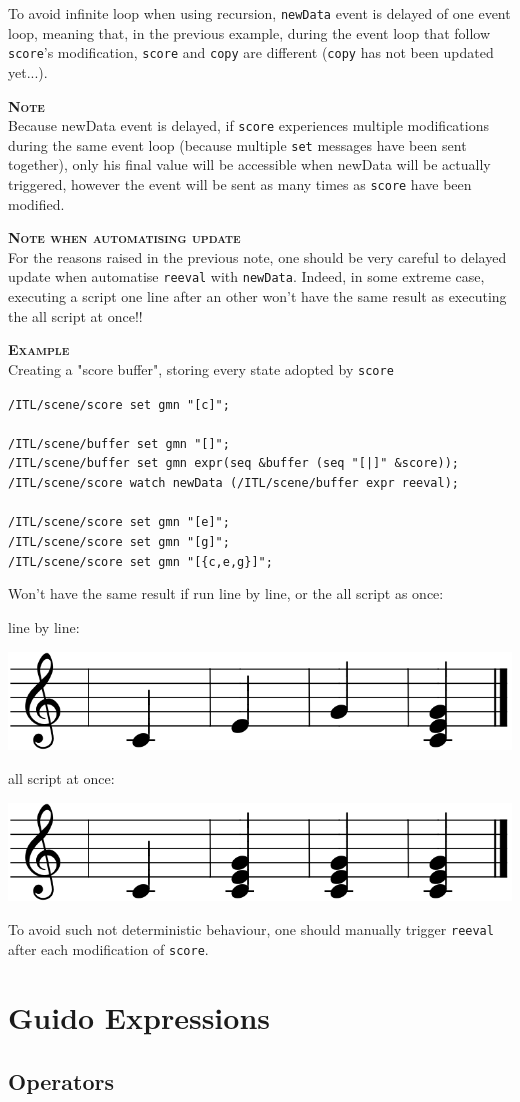 \documentclass[a4paper,twoside]{report}
\newcommand{\toplevel}[1]	{\chapter{#1}}
\newcommand{\sublevel}[1]	{\section{#1}}
\newcommand{\OSC}[1]		{\texttt{#1}}
\newcommand{\example}		{\textbf{\hspace{-1.5cm}\textbf{\textsc{Example }}}}
\newcommand{\note}	[1]		{\vspace{2mm}\textbf{\hspace{-1.03cm}\textbf{\textsc{Note #1}}}}
\newcommand{\sample}	[1]			{\vspace{-2mm}\begin{center}\colorbox{mygrey}{
								\begin{minipage}[t]{0.9\columnwidth} 
								{\small \texttt{#1}}
								\end{minipage}}\end{center}}
\begin{document}
To avoid infinite loop when using recursion, \OSC{newData} event is delayed of one event loop, meaning that, in the previous example, during the event loop that follow \OSC{score}'s modification, \OSC{score} and \OSC{copy} are different (\OSC{copy} has not been updated yet...).

\note\\
Because newData event is delayed, if \OSC{score} experiences multiple modifications during the same event loop (because multiple \OSC{set} messages have been sent together), only his final value will be accessible when newData will be actually triggered, however the event will be sent as many times as \OSC{score} have been modified.

\note {when automatising update}\\
For the reasons raised in the previous note, one should be very careful to delayed update when automatise \OSC{reeval} with \OSC{newData}. Indeed, in some extreme case, executing a script one line after an other won't have the same result as executing the all script at once!!

\example\\
Creating a "score buffer", storing every state adopted by \OSC{score}
\sample{/ITL/scene/score set gmn "[c]";\\
\\
/ITL/scene/buffer set gmn "[]";\\
/ITL/scene/buffer set gmn expr(seq \&buffer (seq "[|]" \&score));\\
/ITL/scene/score watch newData (/ITL/scene/buffer expr reeval);\\
\\
/ITL/scene/score set gmn "[e]";\\
/ITL/scene/score set gmn "[g]";\\
/ITL/scene/score set gmn "[\{c,e,g\}]";
}
Won't have the same result if run line by line, or the all script as once:
\begin{multicols}{2}

line by line:
\begin{center}
 \includegraphics[scale=0.3]{imgs/autoSingleLine}
\end{center}

\columnbreak
all script at once:
\begin{center}
 \includegraphics[scale=0.3]{imgs/autoAllScript}
\end{center}

\end{multicols}

To avoid such not deterministic behaviour, one should manually trigger \OSC{reeval} after each modification of \OSC{score}.

\toplevel{Guido Expressions}
\label{guidoExpr}

\sublevel{Operators}

\printindex
\end{document}
